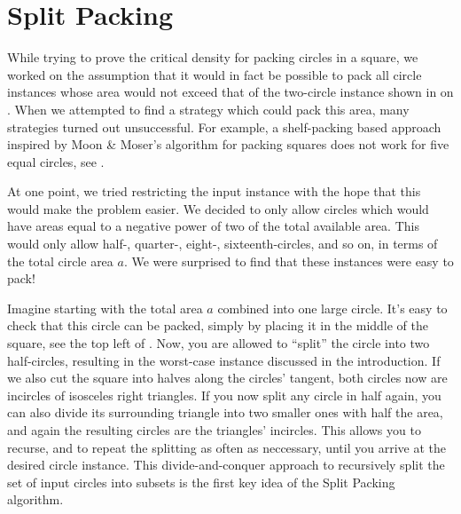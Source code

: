 \documentclass[a4paper,style=print,bibliography=totoc,nexus,lnum,extramargin]{tubsbook}
\begin{document}
\chapter{Split Packing}\label{ch:split-packing}

While trying to prove the critical density for packing circles in a square, we worked on the assumption that it would in fact be possible to pack all circle instances whose area would not exceed that of the two-circle instance shown in  on .
When we attempted to find a strategy which could pack this area, many strategies turned out unsuccessful. For example, a shelf-packing based approach inspired by Moon \& Moser's algorithm for packing squares does not work for five equal circles, see .


At one point, we tried restricting the input instance with the hope that this would make the problem easier. We decided to only allow circles which would have areas equal to a negative power of two of the total available area. This would only allow half-, quarter-, eight-, sixteenth-circles, and so on, in terms of the total circle area $a$. We were surprised to find that these instances were easy to pack!

Imagine starting with the total area $a$ combined into one large circle. It's easy to check that this circle can be packed, simply by placing it in the middle of the square, see the top left of . Now, you are allowed to “split” the circle into two half-circles, resulting in the worst-case instance discussed in the introduction. If we also cut the square into halves along the circles' tangent, both circles now are incircles of isosceles right triangles.
If you now split any circle in half again, you can also divide its surrounding triangle into two smaller ones with half the area, and again the resulting circles are the triangles' incircles.
This allows you to recurse, and to repeat the splitting as often as neccessary, until you arrive at the desired circle instance. This divide-and-conquer approach to recursively split the set of input circles into subsets is the first key idea of the Split Packing algorithm.
\end{document}
